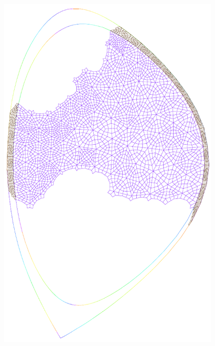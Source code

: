 \begin{figure}
{\includegraphics[scale=.5]{images/tokamak_layer_mesh_adapt_fine_1_ref.pdf}}\quad
\subfigure[{rank = 2}\label{fig:tokamak_layer_mesh_adapt_fine_2_ref}]

\end{figure}
